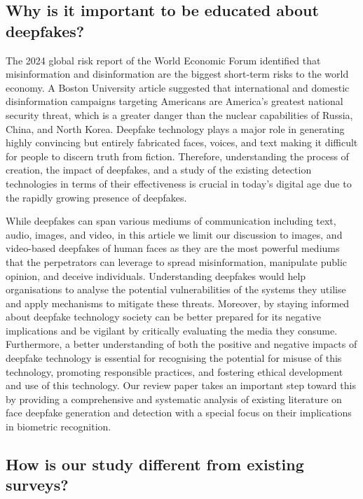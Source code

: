 

\subsection{Why is it important to be educated about deepfakes?}
The 2024 global risk report \cite{wef2024} of the World Economic Forum identified that misinformation and disinformation are the biggest short-term risks to the world economy. A Boston University article \cite{Weinstein2021} suggested that international and domestic disinformation campaigns targeting Americans are America’s greatest national security threat, which is a greater danger than the nuclear capabilities of Russia, China, and North Korea. Deepfake technology plays a major role in generating highly convincing but entirely fabricated faces, voices, and text making it difficult for people to discern truth from fiction. Therefore, understanding the process of creation, the impact of deepfakes, and a study of the existing detection technologies in terms of their effectiveness is crucial in today's digital age due to the rapidly growing presence of deepfakes. 

While deepfakes can span various mediums of communication including text, audio, images, and video, in this article we limit our discussion to images, and video-based deepfakes of human faces as they are the most powerful mediums that the perpetrators can leverage to spread misinformation, manipulate public opinion, and deceive individuals. Understanding deepfakes would help organisations to analyse the potential vulnerabilities of the systems they utilise and apply mechanisms to mitigate these threats. Moreover, by staying informed about deepfake technology society can be better prepared for its negative implications and be vigilant by critically evaluating the media they consume. Furthermore, a better understanding of both the positive and negative impacts of deepfake technology is essential for recognising the potential for misuse of this technology, promoting responsible practices, and fostering ethical development and use of this technology. Our review paper takes an important step toward this by providing a comprehensive and systematic analysis of existing literature on face deepfake generation and detection with a special focus on their implications in biometric recognition. 


\subsection{How is our study different from existing surveys?}


